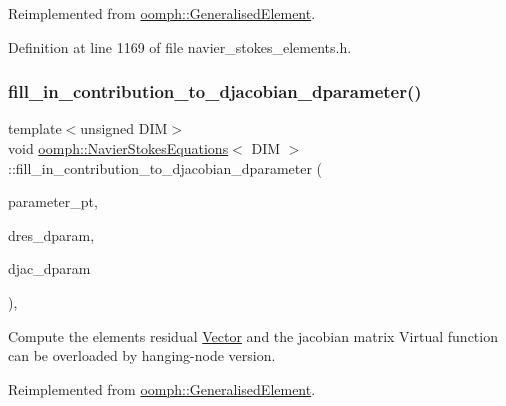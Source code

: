 Reimplemented from \hyperlink{classoomph_1_1GeneralisedElement_a2d6e3c918ebc1f270eebdf4eb1027093}{oomph\+::\+Generalised\+Element}.



Definition at line 1169 of file navier\+\_\+stokes\+\_\+elements.\+h.

\mbox{\label{classoomph_1_1NavierStokesEquations_a93c137baa292eea6159ea74fc667f7de}} 
\subsubsection{\texorpdfstring{fill\+\_\+in\+\_\+contribution\+\_\+to\+\_\+djacobian\+\_\+dparameter()}{fill\_in\_contribution\_to\_djacobian\_dparameter()}}
{\footnotesize\ttfamily template$<$unsigned D\+IM$>$ \\
void \hyperlink{classoomph_1_1NavierStokesEquations}{oomph\+::\+Navier\+Stokes\+Equations}$<$ D\+IM $>$\+::fill\+\_\+in\+\_\+contribution\+\_\+to\+\_\+djacobian\+\_\+dparameter (\begin{DoxyParamCaption}\item[{double $\ast$const \&}]{parameter\+\_\+pt,  }\item[{\hyperlink{classoomph_1_1Vector}{Vector}$<$ double $>$ \&}]{dres\+\_\+dparam,  }\item[{\hyperlink{classoomph_1_1DenseMatrix}{Dense\+Matrix}$<$ double $>$ \&}]{djac\+\_\+dparam }\end{DoxyParamCaption})\hspace{0.3cm}{\ttfamily [inline]}, {\ttfamily [virtual]}}



Compute the element\textquotesingle{}s residual \hyperlink{classoomph_1_1Vector}{Vector} and the jacobian matrix Virtual function can be overloaded by hanging-\/node version. 



Reimplemented from \hyperlink{classoomph_1_1GeneralisedElement_a90ee6ee39dd3950f625148d960f1ba67}{oomph\+::\+Generalised\+Element}.



